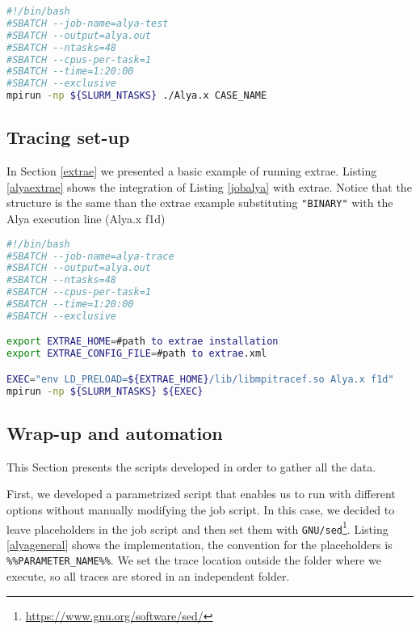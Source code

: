 \begin{lstlisting}[language=sh, caption={Running Alya with SLURM.}, label={jobalya}]
#!/bin/bash
#SBATCH --job-name=alya-test
#SBATCH --output=alya.out
#SBATCH --ntasks=48
#SBATCH --cpus-per-task=1
#SBATCH --time=1:20:00
#SBATCH --exclusive
mpirun -np ${SLURM_NTASKS} ./Alya.x CASE_NAME
\end{lstlisting}

\subsection{Tracing set-up}

In Section \ref{extrae} we presented a basic example of running extrae. Listing \ref{alyaextrae} shows the integration of Listing \ref{jobalya} with extrae. Notice that the structure is the same than the extrae example substituting \texttt{"BINARY"} with the Alya execution line (Alya.x f1d) 

\begin{lstlisting}[language=sh, caption={Running Alya with extrae and SLURM}, label={alyaextrae}]
#!/bin/bash
#SBATCH --job-name=alya-trace
#SBATCH --output=alya.out
#SBATCH --ntasks=48
#SBATCH --cpus-per-task=1
#SBATCH --time=1:20:00
#SBATCH --exclusive

export EXTRAE_HOME=#path to extrae installation
export EXTRAE_CONFIG_FILE=#path to extrae.xml

EXEC="env LD_PRELOAD=${EXTRAE_HOME}/lib/libmpitracef.so Alya.x f1d"
mpirun -np ${SLURM_NTASKS} ${EXEC}
\end{lstlisting}

\subsection{Wrap-up and automation}

This Section presents the scripts developed in order to gather all the data. 

First, we developed a parametrized script that enables us to run with different options without manually modifying the job script. In this case, we decided to leave placeholders in the job script and then set them with \texttt{GNU/sed}\footnote{\url{https://www.gnu.org/software/sed/}}. Listing \ref{alyageneral} shows the implementation, the convention for the placeholders is \texttt{\%\%PARAMETER\_NAME\%\%}. We set the trace location outside the folder where we execute, so all traces are stored in an independent folder. 


